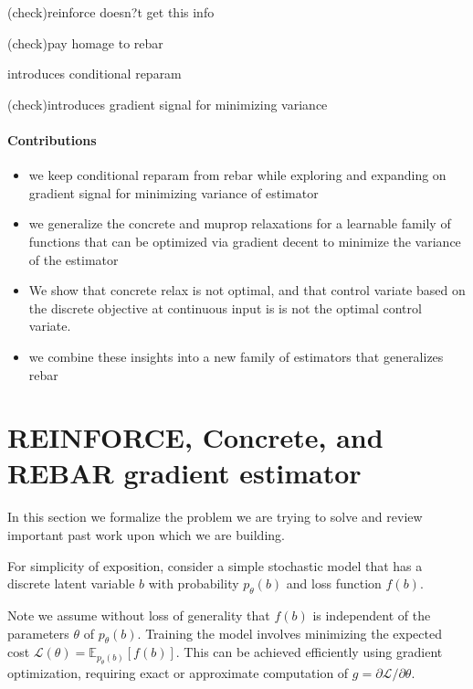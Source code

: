 \documentclass{article}
\newcommand{\discreteDist}{p_{\theta}(b)}
\newcommand{\loss}{f(b)}
\newcommand{\expectedLoss}{\mathbb{E}_{\discreteDist{}}[\loss{}]}
\begin{document}
(check)reinforce doesn?t get this info

(check)pay homage to rebar

introduces conditional reparam

(check)introduces gradient signal for minimizing variance




\paragraph{Contributions}
\begin{itemize}
\item we keep conditional reparam from rebar while exploring and expanding on gradient signal for minimizing variance of estimator
\item we generalize the concrete and muprop relaxations for a learnable family of functions that can be optimized via gradient decent to minimize the variance of the estimator
\item We show that concrete relax is not optimal, and that control variate based on the discrete objective at continuous input is is not the optimal control variate.
\item we combine these insights into a new family of estimators that generalizes rebar
\end{itemize}



\section{REINFORCE, Concrete, and REBAR gradient estimator}
In this section we formalize the problem we are trying to solve and review important past work upon which we are building.

For simplicity of exposition, consider a simple stochastic model that has a discrete latent variable $b$ with probability $\discreteDist{}$ and loss function $\loss{}$.

Note we assume without loss of generality that $\loss{}$ is independent of the parameters  $\theta$ of $\discreteDist{}$.
Training the model involves minimizing the expected cost $\mathcal{L}(\theta)=\expectedLoss{}$.
This can be achieved efficiently using gradient optimization, requiring exact or approximate computation of $g=\partial\mathcal{L} / {\partial \theta}$.
\end{document}
